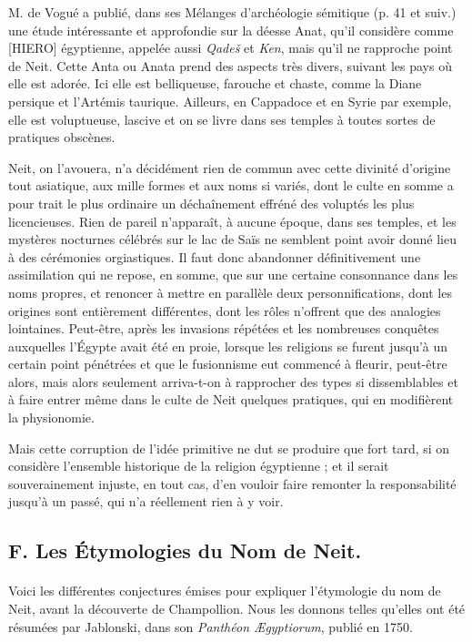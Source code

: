 \documentclass[a4paper, 11pt, oneside]{article}
\begin{document}
M. de Vogué a publié, dans ses Mélanges d'archéologie sémitique (p. 41 et suiv.) une étude intéressante et approfondie sur la déesse Anat, qu'il considère comme [HIERO] égyptienne, appelée aussi \emph{Qadeš} et \emph{Ken}, mais qu'il ne rapproche point de Neit. Cette Anta ou Anata prend des aspects très divers, suivant les pays où elle est adorée. Ici elle est belliqueuse, farouche et chaste, comme la Diane persique et l'Artémis taurique. Ailleurs, en Cappadoce et en Syrie par exemple, elle est voluptueuse, lascive et on se livre dans ses temples à toutes sortes de pratiques obscènes.

Neit, on l'avouera, n'a décidément rien de commun avec cette divinité d'origine tout asiatique, aux mille formes et aux noms si variés, dont le culte en somme a pour trait le plus ordinaire un déchaînement effréné des voluptés les plus licencieuses. Rien de pareil n'apparaît, à aucune époque, dans ses temples, et les mystères nocturnes célébrés sur le lac de Saïs ne semblent point avoir donné lieu à des cérémonies orgiastiques. Il faut donc abandonner définitivement une assimilation qui ne repose, en somme, que sur une certaine consonnance dans les noms propres, et renoncer à mettre en parallèle deux personnifications, dont les origines sont entièrement différentes, dont les rôles n'offrent que des analogies lointaines. Peut-être, après les invasions répétées et les nombreuses conquêtes auxquelles l'Égypte avait été en proie, lorsque les religions se furent jusqu'à un certain point pénétrées et que le fusionnisme eut commencé à fleurir, peut-être alors, mais alors seulement arriva-t-on à rapprocher des types si dissemblables et à faire entrer même dans le culte de Neit quelques pratiques, qui en modifièrent la physionomie.

Mais cette corruption de l'idée primitive ne dut se produire que fort tard, si on considère l'ensemble historique de la religion égyptienne ; et il serait souverainement injuste, en tout cas, d'en vouloir faire remonter la responsabilité jusqu'à un passé, qui n'a réellement rien à y voir.
\clearpage
\subsection{F. Les Étymologies du Nom de Neit.}
\paragraph{}
Voici les différentes conjectures émises pour expliquer l'étymologie du nom de Neit, avant la découverte de Champollion. Nous les donnons telles qu'elles ont été résumées par Jablonski, dans son \emph{Panthéon Ægyptiorum}, publié en 1750.
\end{document}
